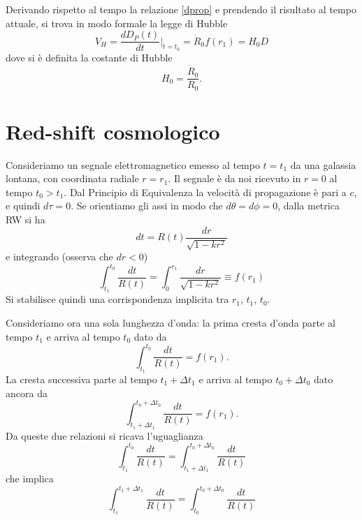 Derivando rispetto al tempo la relazione \eqref{dprop} e prendendo il risultato
al tempo attuale, si trova in modo formale la legge di Hubble
\begin{equation}
  V_H = \frac {dD_P(t)}{dt}|_{t=t_0} = \dot{R}_0 f(r_1) = H_0 D
\end{equation}
dove si è definita la costante di Hubble
\begin{equation}
  H_0=\frac{\dot{R}_0}{R_0}.
\end{equation}

\section{Red-shift cosmologico}

Consideriamo un segnale elettromagnetico emesso al tempo $t=t_1$ da una galassia
lontana, con coordinata radiale $r=r_1$.  Il segnale è da noi ricevuto in $r=0$
al tempo $t_0>t_1$.  Dal Principio di Equivalenza la velocità di propagazione è
pari a $c$, e quindi $d \tau= 0$.  Se orientiamo gli assi in modo che $d \theta
= d \phi=0$, dalla metrica RW si ha
\begin{equation}
  dt = R(t) \frac{dr}{\sqrt{1-kr^2}}
\end{equation}
e integrando (osserva che $dr<0$)
\begin{equation}
  \int_{t_1}^{t_0} \frac{dt}{R(t)} = \int_0^{r_1} \frac{dr}{\sqrt{1-kr^2}}
  \equiv f(r_1)
\end{equation}
Si stabilisce quindi una corrispondenza implicita tra $r_1$, $t_1$, $t_0$.

Consideriamo ora una sola lunghezza d'onda: la prima cresta d'onda parte al
tempo $t_1$ e arriva al tempo $t_0$ dato da
\begin{equation}
  \int_{t_1}^{t_0} \frac{dt}{R(t)} =  f(r_1).
\end{equation}
La cresta successiva parte al tempo $t_1+\Delta t_1$ e arriva al tempo $t_0+
\Delta t_0$ dato ancora da
\begin{equation}
  \int_{t_1+ \Delta t_1}^{t_0+ \Delta t_0} \frac{dt}{R(t)} =  f(r_1).
\end{equation}
Da queste due relazioni si ricava l'uguaglianza
\begin{equation}
  \int_{t_1}^{t_0} \frac{dt}{R(t)} =  \int_{t_1+ \Delta t_1}^{t_0+ \Delta t_0}
  \frac{dt}{R(t)}
\end{equation}
che implica
\begin{equation}
  \int_{t_1}^{t_1+\Delta t_1} \frac{dt}{R(t)} =  \int_{t_0}^{t_0+ \Delta t_0}
  \frac{dt}{R(t)}
  \label{169}
\end{equation}

